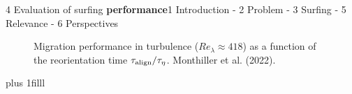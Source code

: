 \begin{frame}{4 Evaluation of surfing \textbf{performance}}{1 Introduction - 2 Problem - 3 Surfing - 5 Relevance - 6 Perspectives}
	\centering
	\vspace{5pt}
	\centering
	\begin{figure}
		
		\caption{
			Migration performance in turbulence ($\mathit{Re}_{\lambda} \approx 418$) as a function of the reorientation time $\tau_{\mathrm{align}} / \tau_{\eta}$. Monthiller et al. (2022).
		}
	\end{figure}

	\vskip0pt plus 1filll

	\vspace{0pt}
	\vspace{30pt}
\end{frame}
